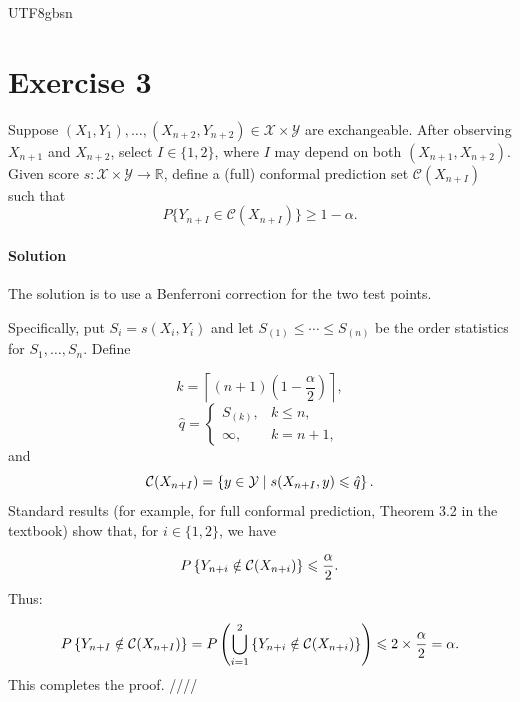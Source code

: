 \documentclass[../../main.tex]{subfiles}
\begin{document}
\begin{CJK*}{UTF8}{gbsn}

\section*{Exercise 3}

Suppose $(X_1,Y_1), \ldots, (X_{n+2},Y_{n+2}) \in \mathcal{X} \times \mathcal{Y}$ 
are exchangeable.
After observing $X_{n+1}$ and $X_{n+2}$, select $I \in \{1,2\}$, where
$I$ may depend on both $(X_{n+1}, X_{n+2})$. 
Given score $s : \mathcal{X} \times \mathcal{Y} \to \mathbb{R}$,
define a (full) conformal prediction set $\mathcal{C}(X_{n+I})$ such that 
\begin{equation*}
    P\{Y_{n+I} \in \mathcal{C}(X_{n+I})\} \geqslant 1-\alpha.
\end{equation*}

\paragraph{Solution}

The solution is to use a Benferroni correction for the two test points.

Specifically,
put $S_i = s(X_i,Y_i)$
and let $S_{(1)} \leqslant \cdots \leqslant S_{(n)}$
be the order statistics for $S_1, \ldots, S_n$.
Define

\begin{equation*}
    k=\left\lceil(n+1)\left(1-\frac{\alpha}{2}\right)\right\rceil,
\end{equation*}
\begin{equation*}
    \hat{q}=
    \begin{cases}
        S_{(k)}, & k \leqslant n,\\
        \infty, & k=n+1,
    \end{cases}
\end{equation*}
and 
\begin{equation*}
    \mathcal{C}(X_{n+I})
    =\left \{  y \in \mathcal{Y} \mid s(X_{n+I},y)\leqslant \hat{q} \right \}.
\end{equation*}
Standard results (for example, for full conformal prediction,
Theorem 3.2 in the textbook) show that,
for $i \in \{1,2\}$, we have 

\begin{equation*}
    P\left \{ Y_{n+i} \notin \mathcal{C}(X_{n+i})  \right \} \leqslant \frac{\alpha}{2}.
\end{equation*}
Thus:

\begin{equation*}
    P \left \{ Y_{n + I} \notin \mathcal{C}(X_{n+I}) \right \}
    = P \left (  \bigcup_{i=1}^2 \left \{ Y_{n+i} \notin \mathcal{C}(X_{n+i}) \right \}
     \right ) \leqslant 2 \times \frac{\alpha}{2} = \alpha.
\end{equation*}
This completes the proof.
////

\end{CJK*}
\end{document}
